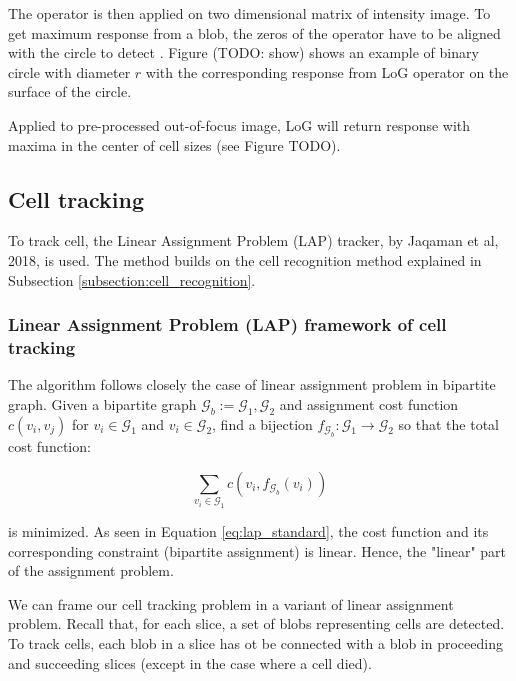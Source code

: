 \documentclass[pdftex,12pt,a4paper]{report}
\begin{document}
The operator is then applied on two dimensional matrix of intensity image. To get maximum response from a blob, the zeros of the operator have to be aligned with the circle to detect \cite{marr1980theory}. Figure (TODO: show) shows an example of binary circle with diameter $r$ with the corresponding response from LoG operator on the surface of the circle.


Applied to pre-processed out-of-focus image, LoG will return response with maxima in the center of cell sizes (see Figure TODO).

\subsection{Cell tracking}
\label{subsection:cell_tracking}

To track cell, the Linear Assignment Problem (LAP) tracker, by Jaqaman et al, 2018, is used. The method builds on the cell recognition method explained in Subsection \ref{subsection:cell_recognition}.

\subsubsection*{Linear Assignment Problem (LAP) framework of cell tracking}

The algorithm follows closely the case of linear assignment problem in bipartite graph. Given a bipartite graph $\mathcal{G}_b:= {\mathcal{G}_1, \mathcal{G}_2}$ and assignment cost function 
$c(v_i, v_j)$ for $v_i \in \mathcal{G}_1$ and $v_i \in \mathcal{G}_2$, find a bijection $f_{\mathcal{G}_b} : \mathcal{G}_1 \rightarrow \mathcal{G}_2$ so that the total cost function:

\begin{equation}
\sum_{v_i \in \mathcal{G}_1} c(v_i, f_{\mathcal{G}_b}(v_i))
\label{eq:lap_standard}
\end{equation}


is minimized. As seen in Equation \ref{eq:lap_standard}, the cost function and its corresponding constraint (bipartite assignment) is linear. Hence, the "linear" part of the assignment problem.

We can frame our cell tracking problem in a variant of linear assignment problem. Recall that, for each slice, a set of blobs representing cells are detected. To track cells, each blob in a slice has ot be connected with a blob in proceeding and succeeding slices (except in the case where a cell died).
\end{document}
